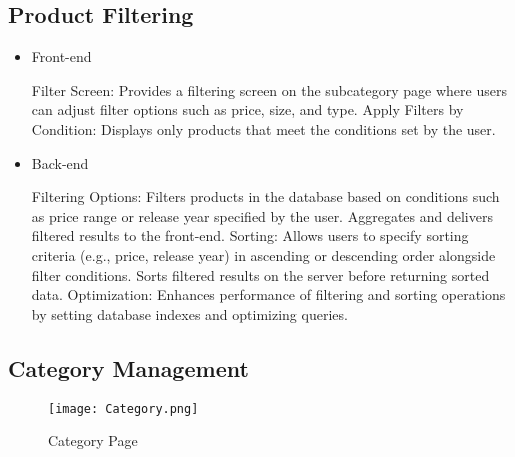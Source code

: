 \documentclass[conference]{IEEEtran}
\begin{document}
\subsection{Product Filtering}

\begin{itemize}
\setlength{\parindent}{2ex}
\item Front-end

Filter Screen: Provides a filtering screen on the subcategory page where users can adjust filter options such as price, size, and type. \newline\hspace*{1.2ex}
Apply Filters by Condition: Displays only products that meet the conditions set by the user.

\item Back-end

Filtering Options: Filters products in the database based on conditions such as price range or release year specified by the user. Aggregates and delivers filtered results to the front-end. \newline\hspace*{1.2ex}
Sorting: Allows users to specify sorting criteria (e.g., price, release year) in ascending or descending order alongside filter conditions. Sorts filtered results on the server before returning sorted data.\newline\hspace*{1.2ex}
Optimization: Enhances performance of filtering and sorting operations by setting database indexes and optimizing queries.

\end{itemize}

\subsection{Category Management}

\begin{figure}[H]
    \centering
    \texttt{[image: Category.png]}
    \caption{Category Page}
    \label{fig:Category Page}
\end{figure}
\end{document}
